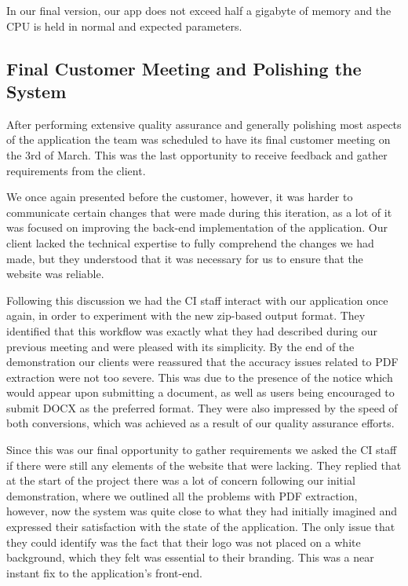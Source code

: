 \documentclass{l3proj}
\begin{document}
In our final version, our app does not exceed half a gigabyte of memory and the CPU is held in normal and expected parameters.

\subsection{Final Customer Meeting and Polishing the System}
\label{sec:final_cust}

After performing extensive quality assurance and generally polishing most aspects of the application the team  was scheduled to have its final customer meeting on the 3rd of March. This was the last opportunity to receive feedback and gather requirements from the client.

We once again presented before the customer, however, it was harder to communicate certain changes that were made during this iteration, as a lot of it was focused on improving the back-end implementation of the application. Our client lacked the technical expertise to fully comprehend the changes we had made, but they understood that it was necessary for us to ensure that the website was reliable.

Following this discussion we had the CI staff interact with our application once again, in order to experiment with the new zip-based output format. They identified that this workflow  was exactly what they had described during our previous meeting and were pleased with its simplicity. By the end of the demonstration our clients were reassured that the accuracy issues related to PDF extraction were not too severe. This was due to the presence of the notice which would appear upon submitting a document, as well as users being encouraged to submit DOCX as the preferred format. They were also impressed by the speed of both conversions, which was achieved as a result of our quality assurance efforts. 

Since this was our final opportunity to gather requirements we asked the CI staff if there were still any elements of the website that were lacking. They replied that at the start of the project there was a lot of concern following our initial demonstration, where we outlined all the problems with PDF extraction, however, now the system was quite close to what they had initially imagined and expressed their satisfaction with the state of the application. The only issue that they could identify was the fact that their logo was not placed on a white background, which they felt was essential to their branding. This was a near instant fix to the application's front-end.
\end{document}
